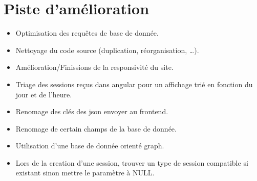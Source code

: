 \section{Piste d'amélioration}
	\begin{itemize}
		\item Optimisation des requêtes de base de donnée.
		\item Nettoyage du code source (duplication, réorganisation, …).
		\item Amélioration/Finissions de la responsivité du site.
		\item Triage des sessions reçus dans angular pour un affichage trié en fonction du jour et de l'heure.
		\item Renomage des clés des json envoyer au frontend.
		\item Renomage de certain champs de la base de donnée.
		\item Utilisation d'une base de donnée orienté graph.
		\item Lors de la creation d'une session, trouver un type de session compatible si existant sinon mettre le paramètre à NULL. 
	\end{itemize}